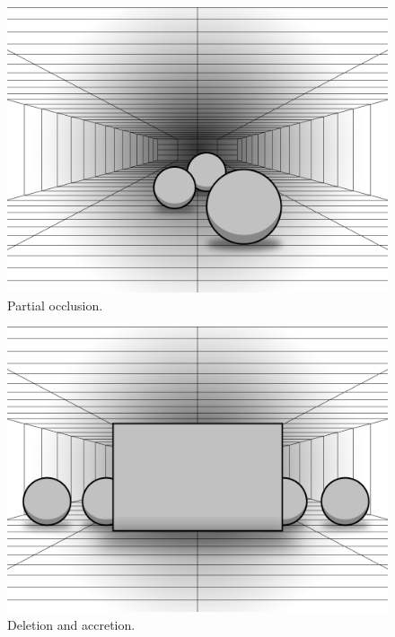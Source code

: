 \begin{figure}[H]
	\centering
	\includegraphics[width=1\linewidth]{figure/Analysis/partialOcclusion.png}
	\caption{Partial occlusion.}
	\label{fig:partialOcclusion}
\end{figure}

\begin{figure}[H]
	\centering
	\includegraphics[width=1\linewidth]{figure/Analysis/deletionAccretion.png}
	\caption{Deletion and accretion.}
	\label{fig:deletionAccretion}
\end{figure}

